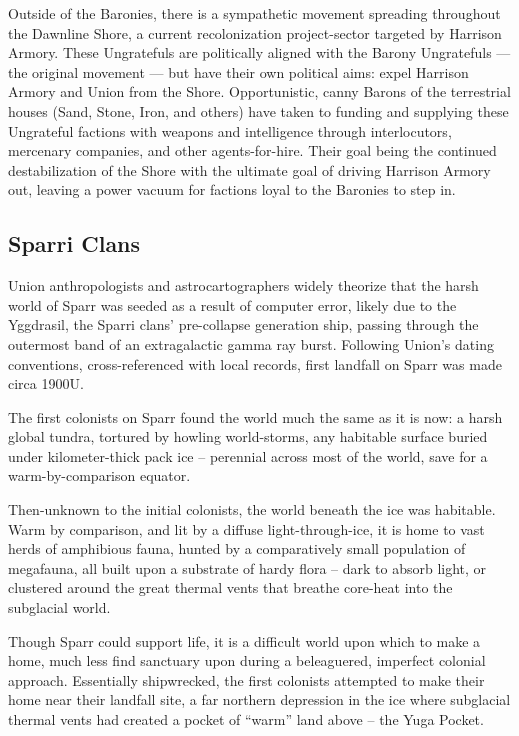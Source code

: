 Outside of the Baronies, there is a sympathetic movement spreading throughout the Dawnline
Shore, a current recolonization project-sector targeted by Harrison Armory. These Ungratefuls
are politically aligned with the Barony Ungratefuls — the original movement — but have their own
political aims: expel Harrison Armory and Union from the Shore. Opportunistic, canny Barons of
the terrestrial houses (Sand, Stone, Iron, and others) have taken to funding and supplying these
Ungrateful factions with weapons and intelligence through interlocutors, mercenary companies,
and other agents-for-hire. Their goal being the continued destabilization of the Shore with the
ultimate goal of driving Harrison Armory out, leaving a power vacuum for factions loyal to the
Baronies to step in.

\subsection{Sparri Clans}

Union anthropologists and astrocartographers widely theorize that the harsh world of Sparr was
seeded as a result of computer error, likely due to the Yggdrasil, the Sparri clans’ pre-collapse
generation ship, passing through the outermost band of an extragalactic gamma ray burst.
Following Union’s dating conventions, cross-referenced with local records, first landfall on Sparr
was made circa 1900U.

The first colonists on Sparr found the world much the same as it is now: a harsh global tundra,
tortured by howling world-storms, any habitable surface buried under kilometer-thick pack ice --
perennial across most of the world, save for a warm-by-comparison equator.

Then-unknown to the initial colonists, the world beneath the ice was habitable. Warm by
comparison, and lit by a diffuse light-through-ice, it is home to vast herds of amphibious fauna,
hunted by a comparatively small population of megafauna, all built upon a substrate of hardy flora
-- dark to absorb light, or clustered around the great thermal vents that breathe core-heat into the
subglacial world.

Though Sparr could support life, it is a difficult world upon which to make a home, much less find
sanctuary upon during a beleaguered, imperfect colonial approach. Essentially shipwrecked, the
first colonists attempted to make their home near their landfall site, a far northern depression in
the ice where subglacial thermal vents had created a pocket of “warm” land above -- the Yuga
Pocket.

